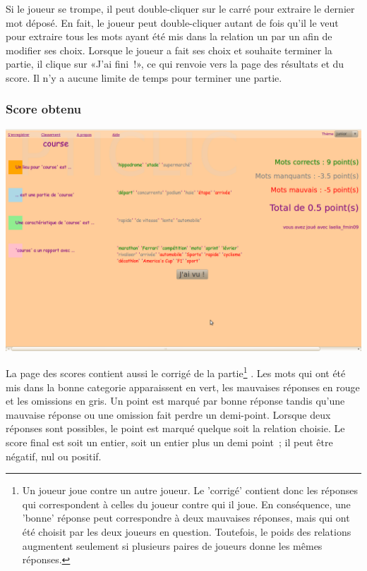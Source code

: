 \documentclass[a4paper,11pt,french]{article}
\begin{document}
Si le joueur se trompe, il peut double-cliquer sur le carré pour extraire le dernier mot déposé. En fait, le joueur peut double-cliquer
autant de fois qu'il le veut pour extraire tous les mots ayant été mis dans la relation un par un afin de modifier ses choix. Lorsque le
joueur a fait ses choix et souhaite terminer la partie, il clique sur «J'ai fini~!», ce qui renvoie vers la page des résultats et du score. Il
n'y a aucune limite de temps pour terminer une partie.

\subsubsection{Score obtenu}
\begin{center}
\includegraphics[width=14cm]{img/PtiClicResultats.png}
\end{center}

La page des scores contient aussi le corrigé de la partie\footnote{Un joueur joue contre un autre joueur. Le 'corrigé' contient donc les réponses qui correspondent à celles du joueur contre qui il joue. En conséquence, une 'bonne' réponse peut correspondre à deux mauvaises réponses, mais qui ont été choisit par les deux joueurs en question. Toutefois, le poids des relations augmentent seulement si plusieurs paires de joueurs donne les mêmes réponses.} . Les mots qui ont été mis dans la bonne categorie apparaissent en vert, les
mauvaises réponses en rouge et les omissions en gris. Un point est marqué par bonne réponse tandis qu'une mauvaise réponse ou une omission
fait perdre un demi-point. Lorsque deux réponses sont possibles, le point est marqué quelque soit la relation choisie. Le score final est
soit un entier, soit un entier plus un demi point~; il peut être négatif, nul ou positif.
\end{document}
